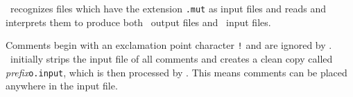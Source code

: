 \label{tex:InputFile}
\mut\ recognizes files which have the extension \verb+.mut+ as input files and reads and interprets them to produce both \mfus\ output files and \tecplot\ input files. 

Comments begin with an exclamation point character \verb+!+ and are ignored by \mut.  \mut\ initially strips the input file of all comments and creates a clean copy called \textit{prefix}\verb+o.input+, which is then processed by \mut.  This means comments can be placed anywhere in the input file.


